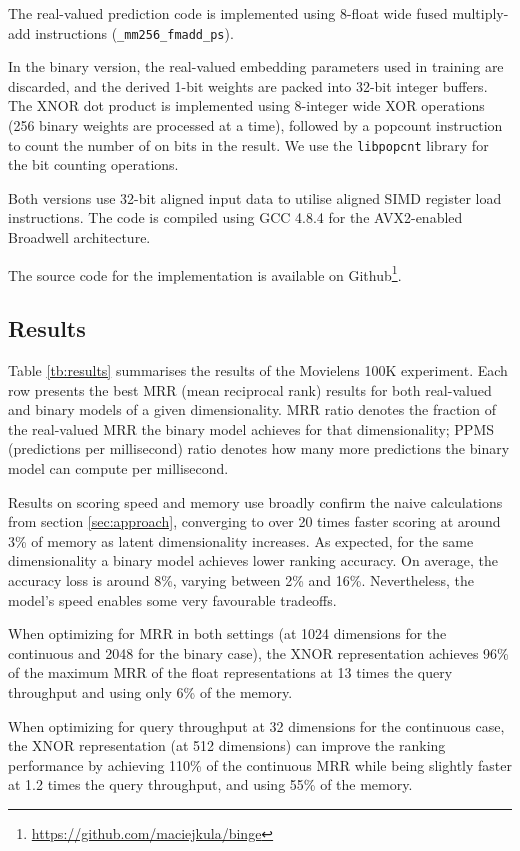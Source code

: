 \documentclass[sigchi]{acmart}
\begin{document}
The real-valued prediction code is implemented using 8-float wide fused multiply-add instructions (\texttt{\_mm256\_fmadd\_ps}).

In the binary version, the real-valued embedding parameters used in training are discarded, and the derived 1-bit weights are packed into 32-bit integer buffers. The XNOR dot product is implemented using 8-integer wide XOR operations (256 binary weights are processed at a time), followed by a popcount instruction to count the number of on bits in the result. We use the \texttt{libpopcnt} \citep{mula2016faster} library for the bit counting operations.

Both versions use 32-bit aligned input data to utilise aligned SIMD register load instructions. The code is compiled using GCC 4.8.4 for the AVX2-enabled Broadwell architecture.

The source code for the implementation is available on Github\footnote{\url{https://github.com/maciejkula/binge}}.

\subsection{Results}
\label{sec:results}
Table \ref{tb:results} summarises the results of the Movielens 100K experiment. Each row presents the best MRR (mean reciprocal rank) results for both real-valued and binary models of a given dimensionality. MRR ratio denotes the fraction of the real-valued MRR the binary model achieves for that dimensionality; PPMS (predictions per millisecond) ratio denotes how many more predictions the binary model can compute per millisecond.

Results on scoring speed and memory use broadly confirm the naive calculations from section \ref{sec:approach}, converging to over 20 times faster scoring at around 3\% of memory as latent dimensionality increases.
As expected, for the same dimensionality a binary model achieves lower ranking accuracy. On average, the accuracy loss is around 8\%, varying between 2\% and 16\%.
Nevertheless, the model's speed enables some very favourable tradeoffs.

When optimizing for MRR in both settings (at 1024 dimensions for the continuous and 2048 for the binary case), the XNOR representation achieves 96\% of the maximum MRR of the float representations at 13 times the query throughput and using only 6\% of the memory.

When optimizing for query throughput at 32 dimensions for the continuous case, the XNOR representation (at 512 dimensions) can improve the ranking performance by achieving 110\% of the continuous MRR while being slightly faster at 1.2 times the query throughput, and using 55\% of the memory.
\end{document}
